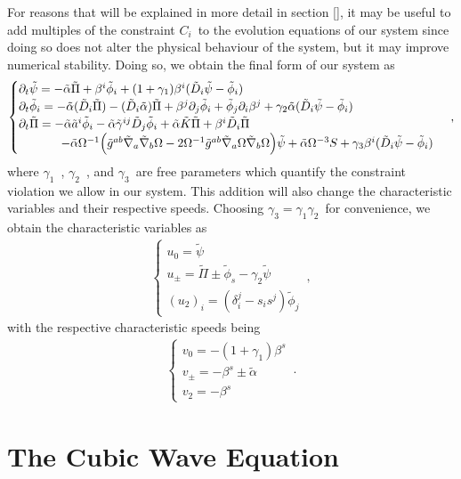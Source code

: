 For reasons that will be explained in more detail in section \ref{}, it may be useful to add multiples of the constraint $C_i$~to the evolution equations of our system since doing so does not alter the physical behaviour of the system, but it may improve numerical stability. Doing so, we obtain the final form of our system as
%
\begin{align}
    \begin{cases}
        \partial_t \tilde{\psi} = - \tilde{\alpha} \tilde{\Pi} + \beta^i \tilde{\phi}_i + (1 + \gamma_1) \beta^i (\tilde{D}_i \tilde{\psi} - \tilde{\phi}_i) \\
        \partial_t \tilde{\phi}_i = - \tilde{\alpha} (\tilde{D}_i \tilde{\Pi}) - (\tilde{D}_i \tilde{\alpha}) \tilde{\Pi} + \beta^j \partial_j \tilde{\phi}_i + \tilde{\phi}_j \partial_i \beta^j + \gamma_2 \tilde{\alpha} (\tilde{D}_i \tilde{\psi} - \tilde{\phi}_i) \\
        \partial_t \tilde{\Pi} = - \tilde{\alpha} \tilde{a}^i \tilde{\phi}_i - \tilde{\alpha} \tilde{\gamma}^{ij} \tilde{D}_j \tilde{\phi}_i + \tilde{\alpha} \tilde{K} \tilde{\Pi} + \beta^i \tilde{D}_i \tilde{\Pi} \\
        \hspace{3.5em} - \tilde{\alpha} \Omega^{-1} \Big( \tilde{g}^{ab} \tilde{\nabla}_a \tilde{\nabla}_b \Omega - 2 \Omega^{-1} \tilde{g}^{ab} \tilde{\nabla}_a \Omega \tilde{\nabla}_b \Omega \Big) \tilde{\psi} + \tilde{\alpha} \Omega^{-3} S + \gamma_3 \beta^i (\tilde{D}_i \tilde{\psi} - \tilde{\phi}_i)
    \end{cases}\,,
    \label{eq:wave_equation_constraint_violation}
\end{align}
%
where $\gamma_1$~, $\gamma_2$~, and $\gamma_3$~are free parameters which quantify the constraint violation we allow in our system. This addition will also change the characteristic variables and their respective speeds. Choosing $\gamma_3 = \gamma_1 \gamma_2$~for convenience, we obtain the characteristic variables as
%
\begin{align}
    \begin{cases}
        u_0 = \tilde{\psi} \\
        u_\pm = \tilde{\Pi} \pm \tilde{\phi}_s - \gamma_2 \tilde{\psi} \\
        (u_2)_i = (\delta_i^j - s_i s^j) \tilde{\phi}_j
    \end{cases}\,,
\end{align}
%
with the respective characteristic speeds being
%
\begin{align}
    \begin{cases}
        v_0 = - (1 + \gamma_1) \beta^s \\
        v_\pm = -\beta^s \pm \tilde{\alpha} \\
        v_2 = -\beta^s
    \end{cases}\,.
\end{align}


\section{The Cubic Wave Equation}
\label{section:cubic_wave_equation}